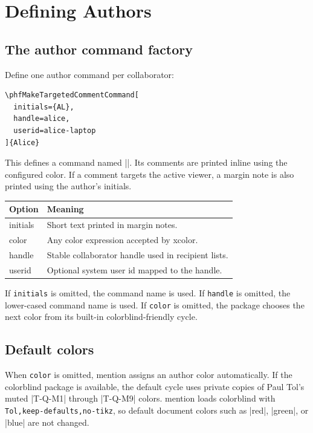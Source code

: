 \documentclass{ltxdoc}
\newcommand*\pkg[1]{\textsf{#1}}
\newcommand*\opt[1]{\texttt{#1}}
\begin{document}
\section{Defining Authors}

\subsection{The author command factory}

Define one author command per collaborator:

\begin{verbatim}
\phfMakeTargetedCommentCommand[
  initials={AL},
  handle=alice,
  userid=alice-laptop
]{Alice}
\end{verbatim}

This defines a command named |\Alice|.  Its comments are printed inline using
the configured color.  If a comment targets the active viewer, a margin note is
also printed using the author's initials.

\begin{center}
\begin{tabular}{>{\ttfamily}ll}
\toprule
Option & Meaning \\
\midrule
initials & Short text printed in margin notes. \\
color & Any color expression accepted by \pkg{xcolor}. \\
handle & Stable collaborator handle used in recipient lists. \\
userid & Optional system user id mapped to the handle. \\
\bottomrule
\end{tabular}
\end{center}

If \opt{initials} is omitted, the command name is used.  If \opt{handle} is
omitted, the lower-cased command name is used.  If \opt{color} is omitted, the
package chooses the next color from its built-in colorblind-friendly cycle.

\subsection{Default colors}

When \opt{color} is omitted, \pkg{mention} assigns an author color
automatically.  If the \pkg{colorblind} package is available, the default cycle
uses private copies of Paul Tol's muted |T-Q-M1| through |T-Q-M9| colors.
\pkg{mention} loads \pkg{colorblind} with \opt{Tol,keep-defaults,no-tikz}, so
default document colors such as |red|, |green|, or |blue| are not changed.
\end{document}
